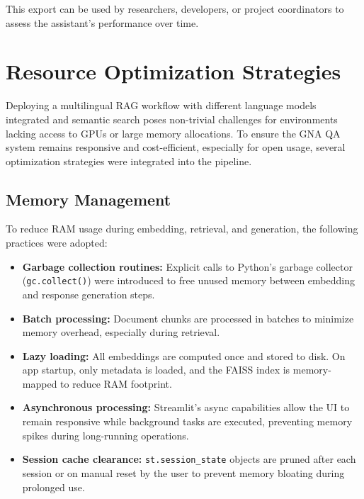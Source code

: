 \begin{spacing}{1.5}
This export can be used by researchers, developers, or project coordinators to assess the assistant's performance over time.


\section{Resource Optimization Strategies}
Deploying a multilingual RAG workflow with different language models integrated and semantic search poses non-trivial challenges for environments lacking access to GPUs or large memory allocations. To ensure the GNA QA system remains responsive and cost-efficient, especially for open usage, several optimization strategies were integrated into the pipeline.

\subsection{Memory Management}
To reduce RAM usage during embedding, retrieval, and generation, the following practices were adopted:
\begin{itemize}
\item \textbf{Garbage collection routines:} Explicit calls to Python's garbage collector (\texttt{gc.collect()}) were introduced to free unused memory between embedding and response generation steps.
\item \textbf{Batch processing:} Document chunks are processed in batches to minimize memory overhead, especially during retrieval.
\item \textbf{Lazy loading:} All embeddings are computed once and stored to disk. On app startup, only metadata is loaded, and the FAISS index is memory-mapped to reduce RAM footprint.
\item \textbf{Asynchronous processing:} Streamlit's async capabilities allow the UI to remain responsive while background tasks are executed, preventing memory spikes during long-running operations.
\item \textbf{Session cache clearance:} \texttt{st.session\_state} objects are pruned after each session or on manual reset by the user to prevent memory bloating during prolonged use.
\end{itemize}


\end{spacing}
